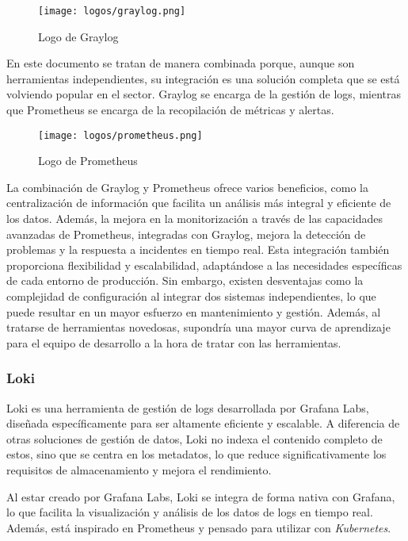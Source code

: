 \begin{figure}[H]
	\centering
	\texttt{[image: logos/graylog.png]}
	\caption{Logo de Graylog~\textregistered}
\end{figure}

En este documento se tratan de manera combinada porque, aunque son herramientas
independientes, su integración es una solución completa que se está volviendo
popular en el sector. Graylog se encarga de la gestión de logs, mientras que
Prometheus se encarga de la recopilación de métricas y alertas.

\begin{figure}[H]
	\centering
	\texttt{[image: logos/prometheus.png]}
	\caption{Logo de Prometheus~\textregistered}
\end{figure}

La combinación de Graylog y Prometheus ofrece varios beneficios, como la
centralización de información que facilita un análisis más integral y
eficiente de los datos. Además, la mejora en la monitorización a través de las
capacidades avanzadas de Prometheus, integradas con Graylog, mejora la detección
de problemas y la respuesta a incidentes en tiempo real. Esta integración
también proporciona flexibilidad y escalabilidad, adaptándose a las necesidades
específicas de cada entorno de producción. Sin embargo, existen desventajas como
la complejidad de configuración al integrar dos sistemas independientes, lo que
puede resultar en un mayor esfuerzo en mantenimiento y gestión. Además, al
tratarse de herramientas novedosas, supondría una mayor curva de aprendizaje
para el equipo de desarrollo a la hora de tratar con las herramientas.


\newpage{}
\subsubsection{Loki}
Loki es una herramienta de gestión de logs desarrollada por Grafana Labs,
diseñada específicamente para ser altamente eficiente y escalable. A diferencia
de otras soluciones de gestión de datos, Loki no indexa el contenido completo de
estos, sino que se centra en los metadatos, lo que reduce significativamente
los requisitos de almacenamiento y mejora el rendimiento.

Al estar creado por Grafana Labs, Loki se integra de forma nativa con Grafana,
lo que facilita la visualización y análisis de los datos de logs en tiempo real.
Además, está inspirado en Prometheus y pensado para utilizar con
\textit{Kubernetes}.

